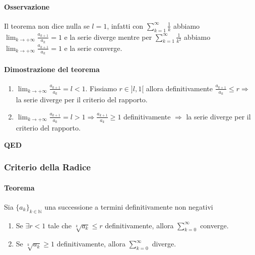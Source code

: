 \documentclass{article}
\newcommand{\N}{\mathbb{N}}
\begin{document}
\paragraph{{Osservazione}}
Il teorema non dice nulla se $l=1$, infatti con $\sum_{k=1}^{\infty} \frac{1}{k}$ abbiamo $\lim_{k \rightarrow +\infty} \frac{a_{k+1}}{a_k}=1$ e la serie diverge mentre per $\sum_{k=1}^{\infty} \frac{1}{k^2} $ abbiamo $\lim_{k \rightarrow +\infty} \frac{a_{k+1}}{a_k}=1$ e la serie converge.

\paragraph{{Dimostrazione del teorema}}
\begin{enumerate}
    \item $\lim_{k \rightarrow +\infty} \frac{a_{k+1}}{a_k}=l < 1$. Fissiamo $r \in ]l, 1[$ allora definitivamente $\frac{a_{k+1}}{a_k}\leq r \Rightarrow$ la serie diverge per il criterio del rapporto.

    \item $\lim_{k \rightarrow +\infty} \frac{a_{k+1}}{a_k} = l > 1 \Rightarrow \frac{a_{k+1}}{a_k} \geq 1$ definitivamente $\Rightarrow$ la serie diverge per il criterio del rapporto.
\end{enumerate}
\begin{flushright}
\textbf{QED}
\end{flushright}

\subsubsection{{Criterio della Radice}}
\paragraph{{Teorema}}
Sia $\{ a_k\}_{k\in \N}$ una successione a termini definitivamente non negativi
\begin{enumerate}
    \item Se $\exists r< 1$ tale che $\sqrt[k]{a_k} \leq r$ definitivamente, allora $\sum_{k=0}^{\infty}$ converge.
    \item Se $\sqrt[k]{a_k} \geq 1$ definitivamente, allora $\sum_{k=0}^{\infty}$  diverge.
\end{enumerate}
\end{document}
